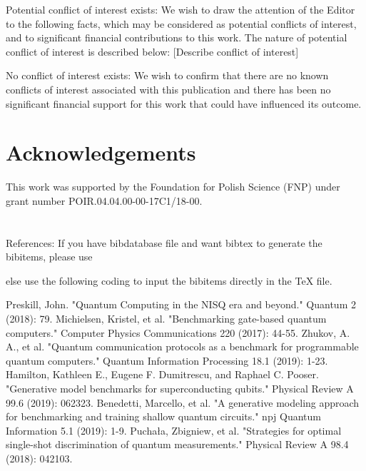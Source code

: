 \documentclass[preprint,12pt, a4paper]{elsarticle}
\newcommand{\1}{{\rm 1\hspace{-0.9mm}l}}
\begin{document}
Potential conflict of interest exists:
We wish to draw the attention of the Editor to the following facts, which may 
be considered as potential conflicts of interest, and to significant financial 
contributions to this work. The nature of potential conflict of interest is 
described below: [Describe conflict of interest]

No conflict of interest exists:
We wish to confirm that there are no known conflicts of interest associated 
with this publication and there has been no significant financial support for 
this work that could have influenced its outcome.


\section*{Acknowledgements}

This work was supported by the Foundation for Polish Science (FNP) under grant
number POIR.04.04.00-00-17C1/18-00.


 \section{}
 \label{}

 References:
 If you have bibdatabase file and want bibtex to generate the
 bibitems, please use

   
  

 else use the following coding to input the bibitems directly in the
 TeX file.
 
 
 
 

\begin{thebibliography}{00}

 Preskill, John. "Quantum Computing in the NISQ era and 
beyond." Quantum 2 (2018): 79.
 Michielsen, Kristel, et al. "Benchmarking 
gate-based quantum computers." Computer Physics Communications 220 (2017): 
44-55.
 Zhukov, A. A., et al. "Quantum communication 
protocols as a benchmark for programmable quantum computers." Quantum 
Information Processing 18.1 (2019): 1-23.
 Hamilton, Kathleen E., Eugene F. Dumitrescu, 
and Raphael C. Pooser. "Generative model benchmarks for superconducting 
qubits." Physical Review A 99.6 (2019): 062323.
 Benedetti, Marcello, et al. "A generative 
modeling approach for benchmarking and training shallow quantum circuits." npj 
Quantum Information 5.1 (2019): 1-9.
 Puchała, Zbigniew, et al. "Strategies for 
optimal single-shot discrimination of quantum measurements." Physical Review A 
98.4 (2018): 042103.
\end{thebibliography}
\end{document}
